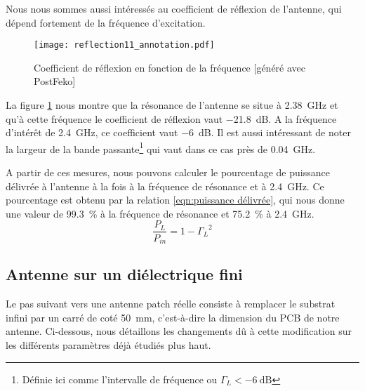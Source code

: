 Nous nous sommes aussi intéressés au coefficient de réflexion de l'antenne, qui dépend fortement de la fréquence d'excitation.
\begin{figure}[htbp]
  \centering
  \texttt{[image: reflection11\_annotation.pdf]}
  \caption{Coefficient de réflexion en fonction de la fréquence [généré avec PostFeko]\label{fig:reflection11_}}
\end{figure}
La figure \ref{fig:reflection11_} nous montre que la résonance de l'antenne se situe à \SI{2.38}{\giga\hertz} et qu'à cette fréquence le coefficient de réflexion vaut \SI{-21.8}{\deci\bel}. A la fréquence d'intérêt de \SI{2.4}{\giga\hertz}, ce coefficient vaut \SI{-6}{\deci\bel}. Il est aussi intéressant de noter la largeur de la bande passante\footnote{Définie ici comme l'intervalle de fréquence ou $\Gamma_L < \SI{-6}{\deci\bel}$} qui vaut dans ce cas près de \SI{0.04}{\giga\hertz}.

A partir de ces mesures, nous pouvons calculer le pourcentage de puissance délivrée à l'antenne à la fois à la fréquence de résonance et à \SI{2.4}{\giga\hertz}. Ce pourcentage est obtenu par la relation \ref{eqn:puissance délivrée}, qui nous donne une valeur de \SI{99.3}{\percent} à la fréquence de résonance et \SI{75.2}{\percent} à \SI{2.4}{\giga\hertz}.
\begin{equation}
\frac{P_L}{P_{in}} = 1-{\Gamma_L}^2
\label{eqn:puissance délivrée}
\end{equation}


\subsection{Antenne sur un diélectrique fini}
Le pas suivant vers une antenne patch réelle consiste à remplacer le substrat infini par un carré de coté \SI{50}{\milli\meter}, c'est-à-dire la dimension du PCB de notre antenne. Ci-dessous, nous détaillons les changements dû à cette modification sur les différents paramètres déjà étudiés plus haut.

